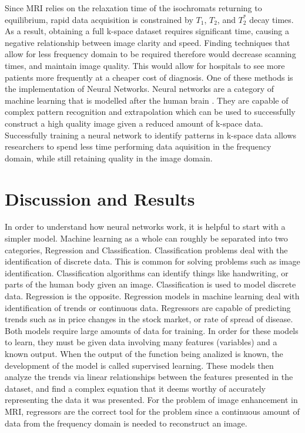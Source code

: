 \documentclass[14pt]{extreport}
\begin{document}
        Since MRI relies on the relaxation time of the isochromats returning to equilibrium, rapid data acquisition is constrained by $T_1$, $T_2$, and $T_2^*$ decay times. As a result, obtaining a full k-space dataset requires significant time, causing a negative relationship between image clarity and speed. Finding techniques that allow for less frequency domain to be required therefore would decrease scanning times, and maintain image quality. This would allow for hospitals to see more patients more frequently at a cheaper cost of diagnosis. One of these methods is the implementation of Neural Networks. Neural networks are a category of machine learning that is modelled after the human brain \cite{Pytorch_Book}. They are capable of complex pattern recognition and extrapolation which can be used to successfully construct a high quality image given a reduced amount of k-space data. Successfully training a neural network to identify patterns in k-space data allows researchers to spend less time performing data aquisition in the frequency domain, while still retaining quality in the image domain.
    
    \section*{Discussion and Results}
        In order to understand how neural networks work, it is helpful to start with a simpler model. Machine learning as a whole can roughly be separated into two categories, Regression and Classification. Classification problems deal with the identification of discrete data. This is common for solving problems such as image identification. Classification algorithms can identify things like handwriting, or parts of the human body given an image. Classification is used to model discrete data. Regression is the opposite. Regression models in machine learning deal with identification of trends or continuous data. Regressors are capable of predicting trends such as in price changes in the stock market, or rate of spread of disease. Both models require large amounts of data for training. In order for these models to learn, they must be given data involving many features (variables) and a known output. When the output of the function being analized is known, the development of the model is called supervised learning. These models then analyze the trends via linear relationships between the features presented in the dataset, and find a complex equation that it deems worthy of accurately representing the data it was presented. For the problem of image enhancement in MRI, regressors are the correct tool for the problem since a continuous amount of data from the frequency domain is needed to reconstruct an image. 
\end{document}
